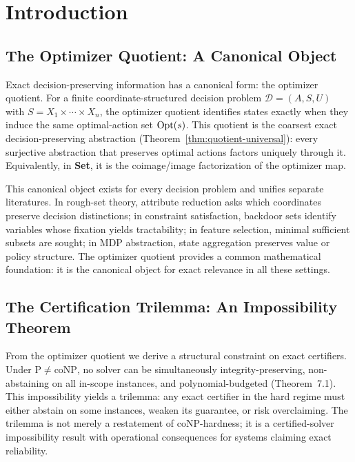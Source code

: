 \section{Introduction}\label{sec:introduction}

\subsection{The Optimizer Quotient: A Canonical Object}

Exact decision-preserving information has a canonical form: the optimizer quotient. For a finite coordinate-structured decision problem $\mathcal{D}=(A,S,U)$ with $S = X_1 \times \cdots \times X_n$, the optimizer quotient identifies states exactly when they induce the same optimal-action set $\mathrm{Opt}(s)$. This quotient is the coarsest exact decision-preserving abstraction (Theorem~\ref{thm:quotient-universal}): every surjective abstraction that preserves optimal actions factors uniquely through it. Equivalently, in \textbf{Set}, it is the coimage/image factorization of the optimizer map.

This canonical object exists for every decision problem and unifies separate literatures. In rough-set theory, attribute reduction asks which coordinates preserve decision distinctions; in constraint satisfaction, backdoor sets identify variables whose fixation yields tractability; in feature selection, minimal sufficient subsets are sought; in MDP abstraction, state aggregation preserves value or policy structure. The optimizer quotient provides a common mathematical foundation: it is the canonical object for exact relevance in all these settings.

\subsection{The Certification Trilemma: An Impossibility Theorem}

From the optimizer quotient we derive a structural constraint on exact certifiers. Under $\mathrm{P} \neq \mathrm{coNP}$, no solver can be simultaneously integrity-preserving, non-abstaining on all in-scope instances, and polynomial-budgeted (Theorem~7.1). This impossibility yields a trilemma: any exact certifier in the hard regime must either abstain on some instances, weaken its guarantee, or risk overclaiming. The trilemma is not merely a restatement of coNP-hardness; it is a certified-solver impossibility result with operational consequences for systems claiming exact reliability.

